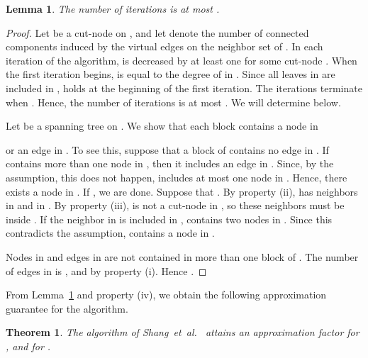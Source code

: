 \documentclass[11pt]{article}
\newtheorem{theorem}{Theorem}
\newtheorem{lemma}{Lemma}
\begin{document}
 \begin{lemma}\label{lem.iterationfor2}
  The number of iterations is at most
  .
 \end{lemma}
   \begin{proof}
    Let  be a cut-node on ,
    and let  denote the 
    number of connected components 
    induced by the virtual edges
    on the neighbor set of .
    In each iteration of the algorithm,
     is decreased by at least one
    for some cut-node .
    When the first iteration begins,
     is equal to the degree of  in .
    Since all leaves in  are included in ,
     holds at the beginning of the first iteration.
    The iterations terminate when
    .
    Hence,
    the number of iterations is at most .
    We will determine  below.

    Let  be a spanning tree on .
    We show that each block contains a node in
    
    or an edge in .
    To see this, suppose that a block  of  contains 
    no edge in .
    If  contains more than one node in ,
    then it includes an edge in .
    Since, by the assumption, this does not happen,  includes
    at most one node in .
    Hence, there exists a node 
     in .
    If , we are done. Suppose that .
    By property (ii),
     has neighbors in  and in .
    By property (iii),  is not a cut-node in , so
    these neighbors must be inside .
    If the neighbor in  is included in ,
     contains two nodes in .
    Since this contradicts the assumption, 
    contains a node in .

    Nodes in  and edges in  are
    not contained in more than one block of .
   The number of edges in  is ,
    and  by property (i).
    Hence .
   \end{proof} 

  From Lemma~\ref{lem.iterationfor2} and property (iv), we obtain the following
  approximation guarantee for the algorithm.
  \begin{theorem}
   The algorithm of Shang~et~al.\ \cite{Shang:2007jg}
   attains an approximation factor
    for , and 
    for .
  \end{theorem}



  
\end{document}
